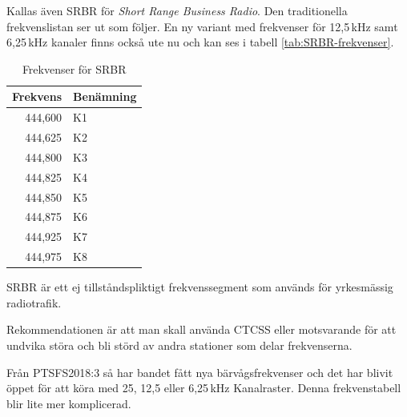 Kallas även SRBR för {\it Short Range Business Radio}.  Den traditionella
frekvenslistan ser ut som följer. En ny variant med frekvenser för 12,5\,kHz
samt 6,25\,kHz kanaler finns också ute nu och kan ses i tabell
\ref{tab:SRBR-frekvenser}.

\begin{table}[h]
	\centering
\begin{tabular}{rl}
	\textbf{Frekvens} & \textbf{Benämning} \\ \hline
	          444,600 & K1                 \\
	          444,625 & K2                 \\
	          444,800 & K3                 \\
	          444,825 & K4                 \\
	          444,850 & K5                 \\
	          444,875 & K6                 \\
	          444,925 & K7                 \\
	          444,975 & K8                 \\
\end{tabular}
\caption{Frekvenser för SRBR}
\end{table}

SRBR är ett ej tillståndspliktigt frekvenssegment som används för
yrkesmässig radiotrafik.

Rekommendationen är att man skall använda CTCSS eller motsvarande för
att undvika störa och bli störd av andra stationer som delar
frekvenserna.

Från PTSFS2018:3 så har bandet fått nya bärvågsfrekvenser och det har
blivit öppet för att köra med 25, 12,5 eller 6,25\,kHz
Kanalraster. Denna frekvenstabell blir lite mer komplicerad.

